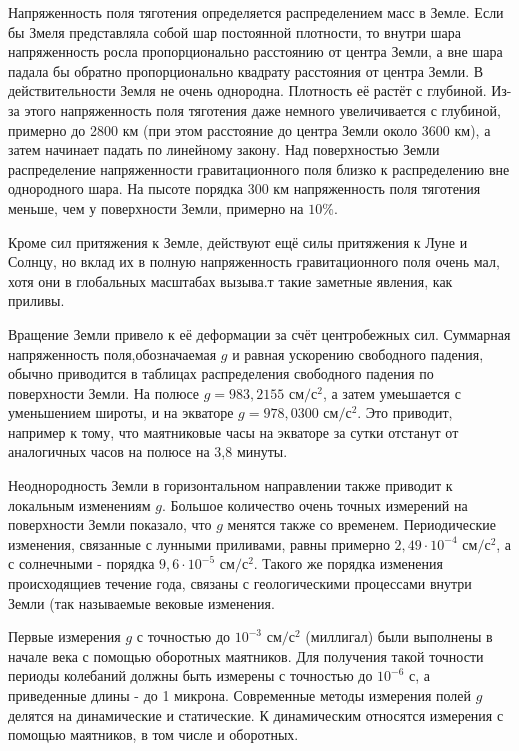 \documentclass[12pt,a4paper]{article}
\begin{document}
Напряженность поля тяготения определяется распределением масс в Земле. Если бы Змеля представляла собой шар постоянной плотности, то внутри шара напряженность росла пропорционально расстоянию от центра Земли, а вне шара падала бы обратно пропорционально квадрату расстояния от центра Земли. В действительности Земля не очень однородна. Плотность её растёт с глубиной. Из-за этого напряженность поля тяготения даже немного увеличивается с глубиной, примерно до 2800 $\textit{км}$ (при этом расстояние до центра Земли около 3600 $\textit{км}$), а затем начинает падать по линейному закону. Над поверхностью Земли распределение напряженности гравитационного поля близко к распределению вне однородного шара. На пысоте порядка 300 $\textit{км}$ напряженность поля тяготения меньше, чем у поверхности Земли, примерно на 
$10 \textit{\%}\textit{.}$

Кроме сил притяжения к Земле, действуют ещё силы притяжения к Луне и Солнцу, но вклад их в полную напряженность гравитационного поля очень мал, хотя они в глобальных масштабах вызыва.т такие заметные явления, как приливы.

Вращение Земли привело к её деформации за счёт центробежных сил. Суммарная напряженность поля,обозначаемая 
\begin{math}
    g
\end{math}
и равная ускорению свободного падения, обычно приводится в таблицах распределения свободного падения по поверхности Земли. На полюсе $g = 983,2155$ $  \textit{см}/\textit{с}^2$, а затем умеьшается с уменьшением широты, и на экваторе $g = 978,0300$ $  \textit{см}/\textit{с}^2$. Это приводит, например к тому, что маятниковые часы на экваторе за сутки отстанут от аналогичных часов на полюсе на 3,8 минуты.

Неоднородность Земли в горизонтальном направлении также приводит к локальным изменениям $g$. Большое количество очень точных измерений на поверхности Земли показало, что $g$ менятся также со временем. Периодические изменения, связанные с лунными приливами, равны примерно $2,49\cdot10^{-4}$ $\textit{см}/\textit{с}^2$, а с солнечными - порядка $9,6\cdot10^{-5}$ $\textit{см}/\textit{с}^2$. Такого же порядка изменения происходящиев течение года, связаны с геологическими процессами внутри Земли (так называемые вековые изменения.

Первые измерения $g$ с точностью до $10^{-3}$ $\textit{см}/\textit{с}^2$ (миллигал) были выполнены в начале века с помощью оборотных маятников. Для получения такой точности периоды колебаний должны быть измерены с точностью до $10^{-6}$ $\textit{с}$, а приведенные длины - до 1 микрона. Современные методы измерения полей $g$ делятся на динамические и статические. К динамическим относятся измерения с помощью маятников, в том числе и оборотных.
\end{document}
